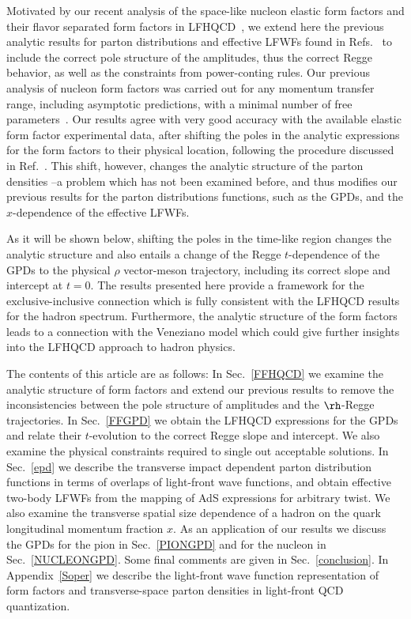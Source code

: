 \documentclass[aps,prd,preprint,groupedaddress]{revtex4-1}
\begin{document}
Motivated by our recent analysis of the space-like nucleon elastic form factors and their flavor separated form factors in LFHQCD~\cite{Sufian:2016hwn}, we  extend here the previous analytic results for parton distributions and effective LFWFs found in Refs.~\cite{Brodsky:2011xx, deTeramond:2012rt} to include the correct pole structure of the amplitudes, thus the correct Regge behavior,  as well as the constraints from power-conting rules. Our previous analysis of nucleon form factors was carried out for any momentum transfer range, including  asymptotic predictions, with a minimal number of free parameters~\cite{Sufian:2016hwn}. Our results agree with very good accuracy with the available elastic form factor experimental data, after shifting the poles in the analytic expressions for the form factors to their physical location, following the procedure discussed in Ref.~\cite{Brodsky:2014yha}. This shift, however, changes the analytic structure of the parton densities --a problem which has not been examined before, and thus modifies our previous results for the parton distributions functions, such as the GPDs, and the $x$-dependence of the effective LFWFs.  

As it will be shown below, shifting the poles in the time-like region  changes the analytic structure and also entails a change of the Regge $t$-dependence of the GPDs to the physical $\rho$ vector-meson  trajectory, including  its correct slope and intercept at $t = 0$.  The results presented here provide a framework for the exclusive-inclusive connection which is fully consistent with the LFHQCD results for the hadron spectrum. Furthermore, the analytic structure of the form factors leads to a connection with the Veneziano model which could give further insights into the LFHQCD approach to hadron physics.



The contents of this article are as follows: {\color{blue} In Sec.~\ref{FFHQCD} we examine the analytic structure of form factors and extend our previous results  to remove the inconsistencies between the pole structure of amplitudes and the $\rh$-Regge trajectories. In Sec.~\ref{FFGPD} we obtain the LFHQCD expressions for the GPDs and relate their $t$-evolution to the correct Regge slope and intercept.} We also examine the physical constraints required to single out acceptable solutions.  In Sec.~\ref{epd} we describe the transverse impact dependent parton distribution functions in terms of overlaps of light-front wave functions, and obtain effective two-body LFWFs from the mapping of AdS expressions for arbitrary twist. We also examine the transverse spatial size dependence of a hadron on the quark longitudinal momentum fraction $x$. As an application of our results we discuss the GPDs for the pion in Sec.~\ref{PIONGPD} and for the nucleon in Sec.~\ref{NUCLEONGPD}. Some final comments are given  in Sec.~\ref{conclusion}. 
In Appendix~\ref{Soper} we describe the light-front wave function representation of form factors and transverse-space parton densities in light-front QCD quantization. 
\end{document}
